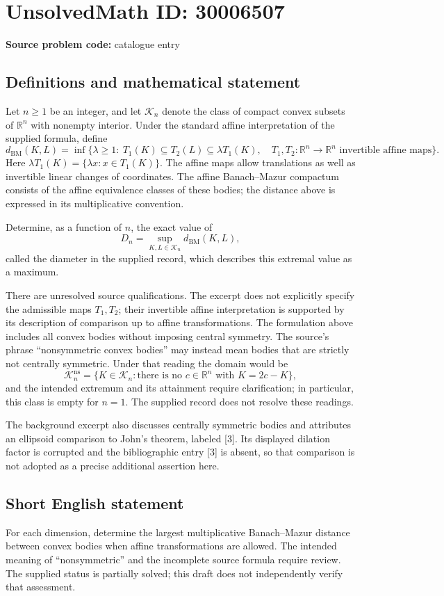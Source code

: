 \documentclass[11pt]{article}
\newcommand{\R}{\mathbb{R}}
\begin{document}
\section*{UnsolvedMath ID: 30006507}
\textbf{Source problem code:} catalogue entry
\subsection{Definitions and mathematical statement}
Let \(n\geq 1\) be an integer, and let \(\mathcal K_n\) denote the class of compact convex subsets of \(\R^n\) with nonempty interior. Under the standard affine interpretation of the supplied formula, define
\[
 d_{\mathrm{BM}}(K,L)=\inf\bigl\{\lambda\geq 1:\ T_1(K)\subseteq T_2(L)\subseteq \lambda T_1(K),\quad T_1,T_2:\R^n\to\R^n\text{ invertible affine maps}\bigr\}.
\]
Here \(\lambda T_1(K)=\{\lambda x:x\in T_1(K)\}\). The affine maps allow translations as well as invertible linear changes of coordinates. The affine Banach--Mazur compactum consists of the affine equivalence classes of these bodies; the distance above is expressed in its multiplicative convention.

Determine, as a function of \(n\), the exact value of
\[
 D_n=\sup_{K,L\in\mathcal K_n}d_{\mathrm{BM}}(K,L),
\]
called the diameter in the supplied record, which describes this extremal value as a maximum.

There are unresolved source qualifications. The excerpt does not explicitly specify the admissible maps \(T_1,T_2\); their invertible affine interpretation is supported by its description of comparison up to affine transformations. The formulation above includes all convex bodies without imposing central symmetry. The source's phrase ``nonsymmetric convex bodies'' may instead mean bodies that are strictly not centrally symmetric. Under that reading the domain would be
\[
 \mathcal K_n^{\mathrm{ns}}=\{K\in\mathcal K_n:\text{there is no }c\in\R^n\text{ with }K=2c-K\},
\]
and the intended extremum and its attainment require clarification; in particular, this class is empty for \(n=1\). The supplied record does not resolve these readings.

The background excerpt also discusses centrally symmetric bodies and attributes an ellipsoid comparison to John's theorem, labeled [3]. Its displayed dilation factor is corrupted and the bibliographic entry [3] is absent, so that comparison is not adopted as a precise additional assertion here.
\subsection{Short English statement}
For each dimension, determine the largest multiplicative Banach--Mazur distance between convex bodies when affine transformations are allowed. The intended meaning of ``nonsymmetric'' and the incomplete source formula require review. The supplied status is partially solved; this draft does not independently verify that assessment.
\end{document}
